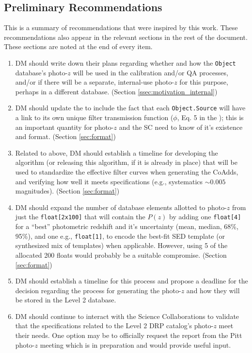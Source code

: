 \documentclass[DM,lsstdraft,toc]{lsstdoc}
\begin{document}
\subsection{Preliminary Recommendations}\label{ssec:intro_pr}

This is a summary of recommendations that were inspired by this work. These recommendations also appear in the relevant sections in the rest of the document. These sections are noted at the end of every item.

\begin{enumerate}
\item DM should write down their plans regarding whether and how the \texttt{Object} database's photo-$z$ will be used in the calibration and/or QA processes, and/or if there will be a separate, internal-use photo-$z$ for this purpose, perhaps in a different database. (Section \ref{ssec:motivation_internal})
\item DM should update the \DPDD to include the fact that each \texttt{Object.Source} will have a link to its own unique filter transmission function ($\phi$, Eq. 5 in the \SRD); this is an important quantity for photo-$z$ and the SC need to know of it's existence and format. (Section \ref{sec:format})
\item Related to above, DM should establish a timeline for developing the algorithm (or releasing this algorithm, if it is already in place) that will be used to standardize the effective filter curves when generating the CoAdds, and verifying how well it meets specifications (e.g., systematics $\sim 0.005$ magnitudes). (Section \ref{sec:format})
\item DM should expand the number of database elements allotted to photo-$z$ from just the \texttt{float[2x100]} that will contain the $P(z)$ by adding one \texttt{float[4]} for a ``best'' photometric redshift and it's uncertainty (mean, median, 68\%, 95\%), and one e.g., \texttt{float[1]}, to encode the best-fit SED template (or synthesized mix of templates) when applicable. However, using 5 of the allocated 200 floats would probably be a suitable compromise. (Section \ref{sec:format})
\item DM should establish a timeline for this process and propose a deadline for the decision regarding the process for generating the photo-$z$ and how they will be stored in the Level 2 database.
\item DM should continue to interact with the Science Collaborations to validate that the specifications related to the Level 2 DRP catalog's photo-$z$ meet their needs. One option may be to officially request the report from the Pitt photo-$z$ meeting which is in preparation and would provide useful input.
\end{enumerate}
\end{document}
